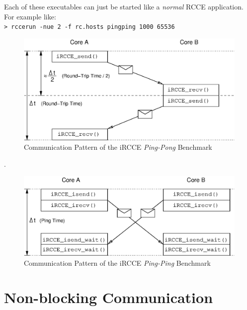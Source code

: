 \documentclass[fontsize=10pt, paper=a4, DIV12, pagesize=auto]{scrartcl}
\begin{document}
\noindent Each of these executables can just be started like a \emph{normal} RCCE application.
For example like: \\
\texttt{> rccerun -nue 2 -f rc.hosts  pingping 1000 65536}

\newpage

\begin{figure}[t]
	\centering
		\includegraphics[width=14.0cm]{iRCCE_PingPong.eps}
	\caption{Communication Pattern of the iRCCE \emph{Ping-Pong} Benchmark}
	\label{fig:iRCCE_PingPong}
\end{figure}

{\tiny.}
\vspace{2.0cm}

\begin{figure}[h]
	\centering
		\includegraphics[width=14.0cm]{iRCCE_PingPing.eps}
	\caption{Communication Pattern of the iRCCE \emph{Ping-Ping} Benchmark}
	\label{fig:iRCCE_PingPing}
\end{figure}

\newpage

\section{Non-blocking Communication}\label{sec:communication}
\end{document}
